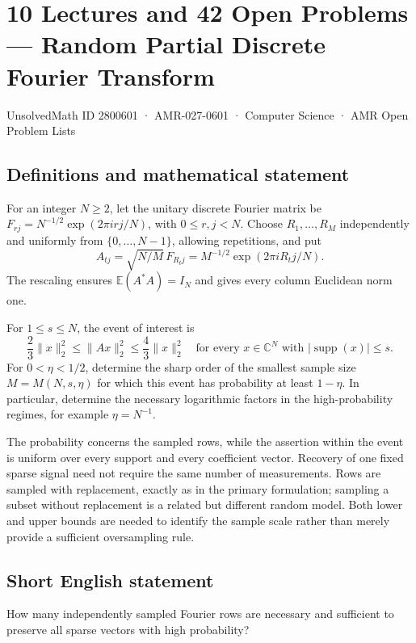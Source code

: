 \documentclass[11pt,a4paper]{article}
\begin{document}
\section*{10 Lectures and 42 Open Problems — Random Partial Discrete Fourier Transform}\label{2800601}
{\small UnsolvedMath ID 2800601 · AMR-027-0601 · Computer Science · AMR Open Problem Lists}
\subsection{Definitions and mathematical statement}
For an integer $N\ge2$, let the unitary discrete Fourier matrix be
$F_{rj}=N^{-1/2}\exp(2\pi i rj/N)$, with $0\le r,j<N$.
Choose $R_1,\ldots,R_M$ independently and uniformly from
$\{0,\ldots,N-1\}$, allowing repetitions, and put
\[
 A_{tj}=\sqrt{N/M}\,F_{R_tj}
       =M^{-1/2}\exp(2\pi i R_tj/N).
\]
The rescaling ensures $\mathbb E(A^*A)=I_N$ and gives every column
Euclidean norm one.

For $1\le s\le N$, the event of interest is
\[
 \frac23\|x\|_2^2\le\|Ax\|_2^2\le\frac43\|x\|_2^2
 \quad\text{for every }x\in\mathbb C^N
       \text{ with }|\operatorname{supp}(x)|\le s.
\]
For $0<\eta<1/2$, determine the sharp order of the smallest sample
size $M=M(N,s,\eta)$ for which this event has probability at least
$1-\eta$. In particular, determine the necessary logarithmic factors
in the high-probability regimes, for example $\eta=N^{-1}$.

The probability concerns the sampled rows, while the assertion within
the event is uniform over every support and every coefficient vector.
Recovery of one fixed sparse signal need not require the same number
of measurements. Rows are sampled with replacement, exactly as in
the primary formulation; sampling a subset without replacement is a
related but different random model. Both lower and upper bounds are
needed to identify the sample scale rather than merely provide a
sufficient oversampling rule.
\subsection{Short English statement}
How many independently sampled Fourier rows are necessary and sufficient to preserve all sparse vectors with high probability?
\end{document}
